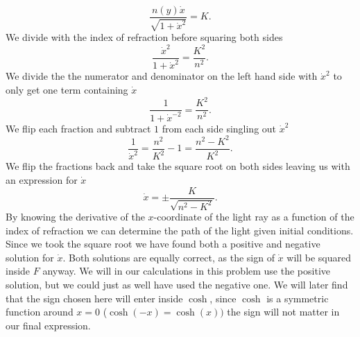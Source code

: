 \documentclass[12pt,twoside]{article}
\begin{document}
\begin{equation}
   \frac{n(y)\dot{x}}{\sqrt{1+\dot{x}^2}} = K.
\end{equation}
We divide with the index of refraction before squaring both sides
\begin{equation}
   \frac{\dot{x}^2}{1+\dot{x}^2} = \frac{K^2}{n^2}.
\end{equation}
We divide the the numerator and denominator on the left hand side with $\dot{x}^2$ to only get one term containing $\dot{x}$
\begin{equation}
   \frac{1}{1+\dot{x}^{-2}} = \frac{K^2}{n^2}.
\end{equation}
We flip each fraction and subtract $1$ from each side singling out $\dot{x}^2$
\begin{equation}
   \frac{1}{\dot{x}^{2}} = \frac{n^2}{K^2}-1 = \frac{n^2-K^2}{K^2}.
\end{equation}
We flip the fractions back and take the square root on both sides leaving us with an expression for $\dot{x}$
\begin{equation}
   \dot{x} = \pm\frac{K}{\sqrt{n^2-K^2}}. \label{2a}
\end{equation}
By knowing the derivative of the $x$-coordinate of the light ray as a function of the index of refraction we can determine the path of the light given initial conditions.\\
Since we took the square root we have found both a positive and negative solution for $\dot{x}$. Both solutions are equally correct, as the sign of $\dot{x}$ will be squared inside $F$ anyway. We will in our calculations in this problem use the positive solution, but we could just as well have used the negative one. We will later find that the sign chosen here will enter inside $\cosh{}$, since $\cosh{}$ is a symmetric function around $x=0$ ($\cosh{(-x)}=\cosh{(x)})$ the sign will not matter in our final expression.
\end{document}

